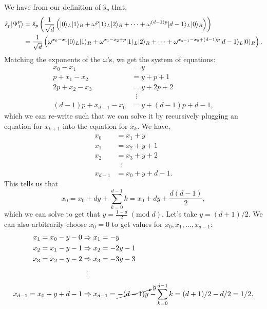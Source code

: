 \begin{enumerate}
\begin{equation}
\begin{split}
  \end{split}
\end{equation}
We have from our definition of $\hat{s}_p$ that:
\begin{equation}
  \begin{split}
        \hat{s}_p | \Psi_1^p \rangle &= \hat{s}_p  \left( \frac{1}{\sqrt{d}}\left(| 0 \rangle_L| 1 \rangle_R + \omega^{p} | 1 \rangle_L| 2 \rangle_R + \cdots + \omega^{(d-1)p} | d-1 \rangle_L| 0 \rangle_R\right) \right) \\
                             &= \frac{1}{\sqrt{d}}\left(\omega^{x_0 - x_1}| 0 \rangle_L| 1 \rangle_R + \omega^{x_1 - x_2 + p}  | 1 \rangle_L| 2 \rangle_R + \cdots + \omega^{x_{d-1} - x_0 + (d-1)p} | d-1 \rangle_L| 0 \rangle_R\right).
  \end{split}
\end{equation}
Matching the exponents of the $\omega$'s, we get the system of equations:
\begin{equation}
  \begin{split}
      x_0 - x_1 &= y \\
  p + x_1 - x_2 &= y + p + 1\\
  2p + x_2 - x_3 &= y + 2p + 2\\
  &\; \; \vdots \\
  (d-1)p + x_{d-1} - x_0 &= y + (d-1)p + d-1,
  \end{split}
\end{equation}
which we can re-write such that we can solve it by recursively plugging an equation for $x_{k+1}$ into the equation for $x_k$. We have,
\begin{equation} \label{sys1}
  \begin{split}
      x_0 &= x_1 + y \\
  x_1 &= x_2 + y + 1\\
  x_2 &= x_3 + y + 2\\
  &\; \; \vdots \\
  x_{d-1} &= x_0 + y + d-1.
  \end{split}
\end{equation}
This tells us that 
\[
x_0 = x_0 + dy + \sum_{k=0}^{d-1} k =  x_0 + dy + \frac{d(d-1)}{2},
\]
which we can solve to get that $y = \frac{1-d}{2} \; (\text{mod}\; d)$. Let's take $y = (d+1)/2$. We can also arbitrarily choose $x_0 = 0$ to get values for $x_0, x_1, \ldots, x_{d-1}$:
\begin{equation}
  \begin{split}
      x_1 = x_0 - y - 0 & \Rightarrow x_1 = -y\\
  x_2 = x_1 - y - 1 & \Rightarrow x_2 = -2y - 1 \\
  x_3 = x_2 - y - 2 & \Rightarrow x_3 = -3y - 3 \\
  & \; \; \vdots \\
  x_{d-1} = x_0 + y + d-1 & \Rightarrow  x_{d-1} = \cancelto{y}{-(d-1)y} - \sum_{k=0}^{d-1} k = (d+1)/2 - d/2 = 1/2.
  \end{split}
\end{equation}


\end{enumerate}
